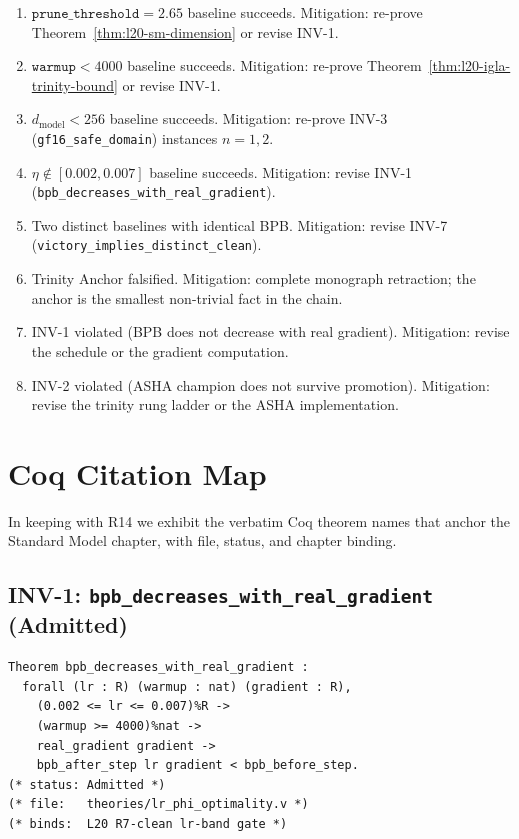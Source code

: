 \begin{enumerate}
  \item[\textbf{F1.}] $\texttt{prune\_threshold} = 2.65$ baseline succeeds.
        Mitigation: re-prove Theorem~\ref{thm:l20-sm-dimension} or revise INV-1.
  \item[\textbf{F2.}] $\texttt{warmup} < 4000$ baseline succeeds.
        Mitigation: re-prove Theorem~\ref{thm:l20-igla-trinity-bound} or revise INV-1.
  \item[\textbf{F3.}] $d_{\text{model}} < 256$ baseline succeeds.
        Mitigation: re-prove INV-3 (\texttt{gf16\_safe\_domain}) instances $n=1, 2$.
  \item[\textbf{F4.}] $\eta \notin [0.002, 0.007]$ baseline succeeds.
        Mitigation: revise INV-1 (\texttt{bpb\_decreases\_with\_real\_gradient}).
  \item[\textbf{F5.}] Two distinct baselines with identical BPB.
        Mitigation: revise INV-7 (\texttt{victory\_implies\_distinct\_clean}).
  \item[\textbf{F6.}] Trinity Anchor falsified.
        Mitigation: complete monograph retraction; the anchor is the smallest non-trivial fact in the chain.
  \item[\textbf{F7.}] INV-1 violated (BPB does not decrease with real gradient).
        Mitigation: revise the schedule or the gradient computation.
  \item[\textbf{F8.}] INV-2 violated (ASHA champion does not survive promotion).
        Mitigation: revise the trinity rung ladder or the ASHA implementation.
\end{enumerate}

\section{Coq Citation Map}
\label{sec:l20-coq-citation-map}

In keeping with R14 we exhibit the verbatim Coq theorem names that
anchor the Standard Model chapter, with file, status, and chapter
binding.

\subsection{INV-1: \texttt{bpb\_decreases\_with\_real\_gradient} (Admitted)}

\begin{verbatim}
Theorem bpb_decreases_with_real_gradient :
  forall (lr : R) (warmup : nat) (gradient : R),
    (0.002 <= lr <= 0.007)%R ->
    (warmup >= 4000)%nat ->
    real_gradient gradient ->
    bpb_after_step lr gradient < bpb_before_step.
(* status: Admitted *)
(* file:   theories/lr_phi_optimality.v *)
(* binds:  L20 R7-clean lr-band gate *)
\end{verbatim}

